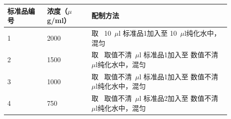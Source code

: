 \documentclass[UTF8,10pt,a4paper,fontset=fandol]{ctexart}
\newcommand{\fieldvalue}[1]{#1}
\newcommand{\handwritten}[1]{#1}
\begin{document}
\begin{tabular}{|p{0.16\linewidth}|p{0.18\linewidth}|p{0.56\linewidth}|}
\hline
标准品编号 & 浓度（$\mu$g/ml） & 配制方法 \\
\hline
1 & 2000 &
取\ %
\fieldvalue{\handwritten{10}}\ $\mu$l 标准品1加入至\newline 
\fieldvalue{\handwritten{10}}\ $\mu$l纯化水中，混匀 \\
\hline
2 & 1500 &
取\ %
\fieldvalue{\handwritten{取值不清}}\ $\mu$l 标准品1加入至\newline 
\fieldvalue{\handwritten{数值不清}}\ $\mu$l纯化水中，混匀 \\
\hline
3 & 1000 &
取\ %
\fieldvalue{\handwritten{取值不清}}\ $\mu$l 标准品1加入至\newline 
\fieldvalue{\handwritten{数值不清}}\ $\mu$l纯化水中，混匀 \\
\hline
4 & 750 &
取\ %
\fieldvalue{\handwritten{取值不清}}\ $\mu$l 标准品2加入至\newline 
\fieldvalue{\handwritten{数值不清}}\ $\mu$l纯化水中，混匀 \\
\hline
\end{tabular}


\newpage
\end{document}
